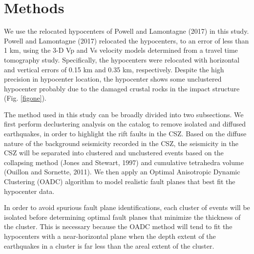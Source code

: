 \documentclass[draft]{agujournal2018}
\begin{document}
    

 
 
 
 
 
 
 
 
    
\section{Methods}
We use the relocated hypocenters of Powell and Lamontagne (2017) in this study. Powell and Lamontagne (2017) relocated the hypocenters, to an error of less than 1 km, using the 3-D Vp and Vs velocity models determined from a travel time tomography study. Specifically, the hypocenters were relocated with horizontal and vertical errors of 0.15 km and 0.35 km, respectively. Despite the high precision in hypocenter location, the hypocenter shows some unclustered hypocenter probably due to the damaged crustal rocks in the impact structure (Fig. \ref{figone}).

The method used in this study can be broadly divided into two subsections. We first perform declustering analysis on the catalog to remove isolated and diffused earthquakes, in order to highlight the rift faults in the CSZ. Based on the diffuse nature of the background seismicity recorded in the CSZ, the seismicity in the CSZ will be separated into clustered and unclustered events based on the collapsing method (Jones and Stewart, 1997) and cumulative tetrahedra volume (Ouillon and Sornette, 2011). We then apply an Optimal Anisotropic Dynamic Clustering (OADC) algorithm to model realistic fault planes that best fit the hypocenter data. 

In order to avoid spurious fault plane identifications, each cluster of events will be isolated before determining optimal fault planes that minimize the thickness of the cluster. This is necessary because the OADC method will tend to fit the hypocenters with a near-horizontal plane when the depth extent of the earthquakes in a cluster is far less than the areal extent of the cluster. 
\end{document}
